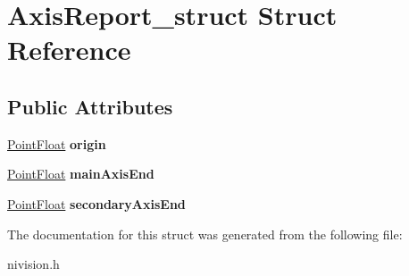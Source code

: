 \hypertarget{structAxisReport__struct}{\section{\-Axis\-Report\-\_\-struct \-Struct \-Reference}
\label{structAxisReport__struct}
}
\subsection*{\-Public \-Attributes}
\begin{DoxyCompactItemize}
\item 
\hypertarget{structAxisReport__struct_ae9947337118dc61e3fb3b3bc6200c6c5}{\hyperlink{structPointFloat__struct}{\-Point\-Float} {\bfseries origin}}\label{structAxisReport__struct_ae9947337118dc61e3fb3b3bc6200c6c5}

\item 
\hypertarget{structAxisReport__struct_afda8656840b925fa98a78f810e26d554}{\hyperlink{structPointFloat__struct}{\-Point\-Float} {\bfseries main\-Axis\-End}}\label{structAxisReport__struct_afda8656840b925fa98a78f810e26d554}

\item 
\hypertarget{structAxisReport__struct_a4eee2e398b0d7aed4efc95cadcbcadc5}{\hyperlink{structPointFloat__struct}{\-Point\-Float} {\bfseries secondary\-Axis\-End}}\label{structAxisReport__struct_a4eee2e398b0d7aed4efc95cadcbcadc5}

\end{DoxyCompactItemize}


\-The documentation for this struct was generated from the following file\-:\begin{DoxyCompactItemize}
\item 
nivision.\-h\end{DoxyCompactItemize}
